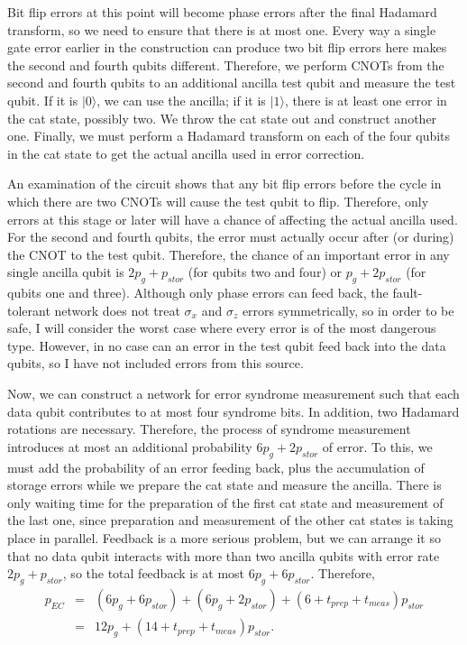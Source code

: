\documentclass{report}
\newcommand{\ket}[1]{|{#1}\rangle}
\newcommand{\X}{\sigma_x}
\newcommand{\Z}{\sigma_z}
\begin{document}
Bit flip errors at this point will become phase errors after the final 
Hadamard transform, so we need to ensure that there is at most one.  
Every way a single gate error earlier in the construction can produce two 
bit flip errors here makes the second and fourth qubits different.  
Therefore, we perform CNOTs from the second and fourth qubits to an 
additional ancilla test qubit and measure the test qubit.  If it is $\ket{0}$, 
we can use the ancilla; if it is $\ket{1}$, there is at least one error in the 
cat state, possibly two.  We throw the cat state out and construct another 
one.  Finally, we must perform a Hadamard transform on each of the four 
qubits in the cat state to get the actual ancilla used in error correction.

An examination of the circuit shows that any bit flip errors before the 
cycle in which there are two CNOTs will cause the test qubit to flip.  
Therefore, only errors at this stage or later will have a chance of affecting 
the actual ancilla used.  For the second and fourth qubits, the error must 
actually occur after (or during) the CNOT to the test qubit.  Therefore, the 
chance of an important error in any single ancilla qubit is $2 p_g + 
p_{stor}$ (for qubits two and four) or $p_g + 2p_{stor}$ (for qubits one and 
three).  Although only phase errors can feed back, the fault-tolerant network 
does not treat $\X$ and $\Z$ errors symmetrically, so in order to be safe, I 
will consider the worst case where every error is of the most  dangerous type.  
However, in no case can an error in the test qubit feed back into the data 
qubits, so I have not included errors from this source.

Now, we can construct a network for error syndrome measurement such 
that each data qubit contributes to at most four syndrome bits.  In 
addition, two Hadamard rotations are necessary.  Therefore, the process of 
syndrome measurement introduces at most an additional probability $6 
p_g + 2 p_{stor}$ of error.  To this, we must add the probability of an error 
feeding back, plus the accumulation of storage errors while we prepare the 
cat state and measure the ancilla.  There is only waiting time for the 
preparation of the first cat state and measurement of the last one, since 
preparation and measurement of the other cat states is taking place in 
parallel.  Feedback is a more serious problem, but we can arrange it so 
that no data qubit interacts with more than two ancilla qubits with error 
rate $2p_g + p_{stor}$, so the total feedback is at most $6 p_g + 6 p_{stor}$. 
Therefore,
\begin{eqnarray}
p_{EC} &  = & (6 p_g + 6 p_{stor}) + (6 p_g + 2 p_{stor}) + 
(6 + t_{prep} + t_{meas}) p_{stor} \\
&  = &  12 p_g + (14 + t_{prep} + t_{meas}) p_{stor}.
\end{eqnarray}
\end{document}
